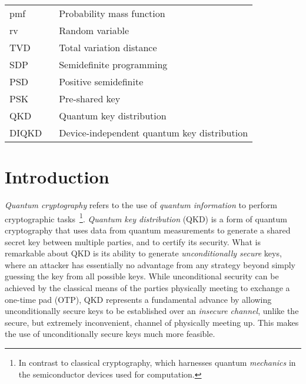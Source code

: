 \documentclass[10pt, a4paper]{article}
\numberwithin{equation}{section} %
\theoremstyle{definition}
\theoremstyle{plain}
\newcommand{\?}{\mathrel{?}} %
\begin{document}
\begin{center}
\begin{longtable*}{p{0.2\linewidth}|p{0.8\linewidth}}
        pmf & Probability mass function \\
        rv & Random variable \\
        TVD & Total variation distance \\
        SDP & Semidefinite programming \\
        PSD & Positive semidefinite \\
        PSK & Pre-shared key \\
        QKD & Quantum key distribution \\
        DIQKD & Device-independent quantum key distribution \\
      \end{longtable*}
    \end{center}
    \clearpage

    \section{Introduction}

    \emph{Quantum cryptography} refers to the use of \emph{quantum information} to perform cryptographic tasks~\cite{SecurityQKD, AdvancesQuantumCrypto}\footnote{In contrast to classical cryptography, which harnesses quantum \emph{mechanics} in the semiconductor devices used for computation.}. \emph{Quantum key distribution} (QKD) is a form of quantum cryptography that uses data from quantum measurements to generate a shared secret key between multiple parties, and to certify its security. What is remarkable about QKD is its ability to generate \emph{unconditionally secure} keys, where an attacker has essentially no advantage from any strategy beyond simply guessing the key from all possible keys. While unconditional security can be achieved by the classical means of the parties physically meeting to exchange a one-time pad (OTP), QKD represents a fundamental advance by allowing unconditionally secure keys to be established over an \emph{insecure channel}, unlike the secure, but extremely inconvenient, channel of physically meeting up. This makes the use of unconditionally secure keys much more feasible.
\end{document}
